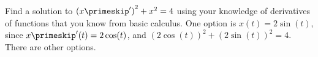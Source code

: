 {Find a solution to
${(x\primeskip')}^2 + x^2 = 4$
using your knowledge of derivatives of functions that you
know from basic calculus.}
{One option is $x(t)=2\sin (t)$, since $x\primeskip'(t) = 2\cos (t)$, and $(2\cos(t))^2+(2\sin(t))^2 = 4$. There are other options.}